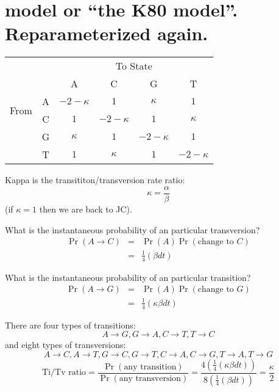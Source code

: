\documentclass[landscape]{foils}
\begin{document}
\myNewSlide
\section*{\citet{Kimura1980} model or ``the K80 model''. Reparameterized again.}
\Large
\begin{table}[htdp]
\begin{center}
\begin{tabular}{cc|cccc}
& & \multicolumn{4}{c}{To State} \\
& & A & C & G & T \\
\hline
\multirow{2}{*}{From } & A &  $-2-\kappa$ & $1 $ & $\kappa$ & $1 $    \\
\multirow{2}{*}{State } &C & $1 $ & $-2-\kappa$ & $1 $ & $\kappa$    \\
 &G & $\kappa$ & $1 $ & $-2 - \kappa$ & $1 $    \\
 &T & $1 $ & $\kappa$ & $1 $ & $-2 - \kappa$    \\
\end{tabular}
\end{center}
\end{table}

\myNewSlide
Kappa is the transititon/transversion rate ratio:
\[\kappa = \frac{\alpha}{\beta}\]
(if $\kappa = 1$ then we are back to JC).

\myNewSlide
What is the instantaneous probability of an  particular transversion?
\begin{eqnarray*}
	\Pr(A\rightarrow C) & = & \Pr(A)\Pr(\mbox{change to } C) \\
& =  & \frac{1}{4}\left(\beta dt\right)
\end{eqnarray*}

\myNewSlide
What is the instantaneous probability of an  particular transition?
\begin{eqnarray*}
	\Pr(A\rightarrow G) & = & \Pr(A)\Pr(\mbox{change to } G) \\
& =  & \frac{1}{4}\left(\kappa\beta dt\right)
\end{eqnarray*}

\myNewSlide
\large
There are four types of transitions:
	\[A\rightarrow G ,G\rightarrow A ,C\rightarrow T, T\rightarrow C \]
and eight types of transversions:
	\[A\rightarrow C ,A\rightarrow T ,G\rightarrow C ,G\rightarrow T ,C\rightarrow A, C\rightarrow G,T\rightarrow A, T\rightarrow G \]
	\[\mbox{Ti/Tv ratio} = \frac{\Pr(\mbox{any transition})}{\Pr(\mbox{any transversion})} = \frac{4\left(\frac{1}{4}\left(\kappa\beta dt\right)\right)}{8\left(\frac{1}{4}\left(\beta dt\right)\right)} = \frac{\kappa}{2}\]
\end{document}
